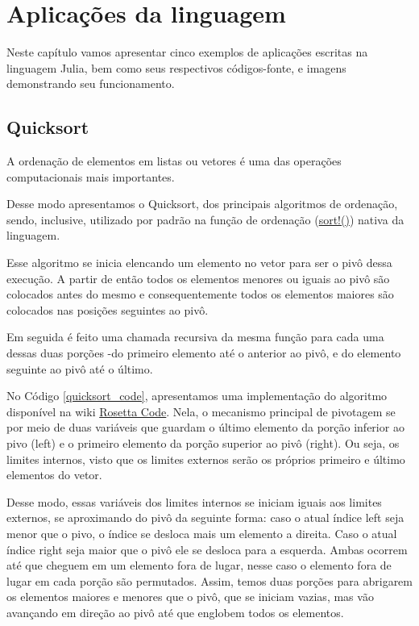 %


\chapter{Aplicações da linguagem}

Neste capítulo vamos apresentar cinco exemplos de aplicações escritas na linguagem Julia, bem como seus respectivos códigos-fonte, e imagens demonstrando seu funcionamento. 

\section{Quicksort}
A ordenação de elementos em listas ou vetores é uma das operações computacionais mais importantes. 

Desse modo apresentamos o Quicksort, dos principais algoritmos de ordenação, sendo, inclusive, utilizado por padrão na função de ordenação (\href{https://github.com/JuliaLang/julia/blob/2364748377f2a79c0485fdd5155ec2116c9f0d37/base/sort.jl#L259-L296}{sort!()}) nativa da linguagem. 
\newline

Esse algoritmo se inicia elencando um elemento no vetor para ser o pivô dessa execução. 
A partir de então todos os elementos menores ou iguais ao pivô são colocados antes do mesmo e consequentemente todos os elementos maiores são colocados nas posições seguintes ao pivô. 

Em seguida é feito uma chamada recursiva da mesma função para cada uma dessas duas porções -do primeiro elemento até o anterior ao pivô, e do elemento seguinte ao pivô até o último. 

No Código \ref{quicksort_code}, apresentamos uma implementação do algoritmo disponível na wiki \href{https://rosettacode.org/wiki/Sorting_algorithms/Quicksort#Julia}{Rosetta Code}. 
Nela, o mecanismo principal de pivotagem se por meio de duas variáveis que guardam o último elemento da porção inferior ao pivo (left) e o primeiro elemento da porção superior ao pivô (right). Ou seja, os limites internos, visto que os limites externos serão os próprios primeiro e último elementos do vetor. 

Desse modo, essas variáveis dos limites internos se iniciam iguais aos limites externos, se aproximando do pivô da seguinte forma: 
caso o atual índice left seja menor que o pivo, o índice se desloca mais um elemento a direita.
Caso o atual índice right seja maior que o pivô ele se desloca para a esquerda.
Ambas ocorrem até que cheguem em um elemento fora de lugar, nesse caso o elemento fora de lugar em cada porção são permutados. 
Assim, temos duas porções para abrigarem os elementos maiores e menores que o pivô, que se iniciam vazias, mas vão avançando em direção ao pivô até que englobem todos os elementos. 

